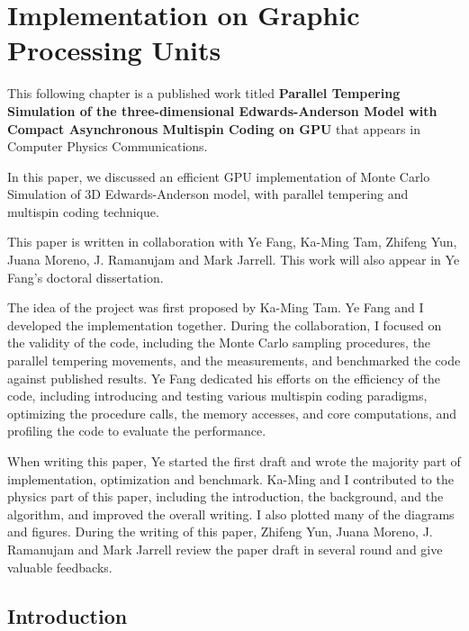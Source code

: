 \chapter{Implementation on Graphic Processing Units}
\label{chap:SG_imp}
This following chapter is a published work titled {\bf Parallel Tempering 
Simulation of the three-dimensional Edwards-Anderson Model  with  Compact 
Asynchronous Multispin Coding on GPU} that appears in Computer Physics Communications.
\citep{Fang-Feng-Tam-etal-2013}

In this paper, we discussed an efficient GPU implementation of Monte Carlo 
Simulation of 3D Edwards-Anderson model, with parallel tempering and multispin 
coding technique. 

This paper is written in collaboration with Ye Fang, Ka-Ming Tam, Zhifeng Yun, 
Juana Moreno, J. Ramanujam and Mark Jarrell. 
This work will also appear in Ye Fang's doctoral dissertation. 

The idea of the project was first proposed by Ka-Ming Tam. 
Ye Fang and I developed the implementation together. 
During the collaboration, I focused on the validity of the code, including the 
Monte Carlo sampling procedures, the parallel tempering movements, and the 
measurements, and benchmarked the code against published results. 
Ye Fang dedicated his efforts on the efficiency of the code, including 
introducing and testing various multispin coding paradigms, optimizing the 
procedure calls, the memory accesses, and core computations, and profiling the 
code to evaluate the performance. 

When writing this paper, Ye started the first draft and wrote the majority part 
of implementation, optimization and benchmark. 
Ka-Ming and I contributed to the physics part of this paper, including the 
introduction, the background, and the algorithm, and improved the overall writing. 
I also plotted many of the diagrams and figures.
During the writing of this paper, Zhifeng Yun, Juana Moreno, J. Ramanujam and 
Mark Jarrell  review the paper draft in several round and give valuable 
feedbacks.


\section{Introduction}

